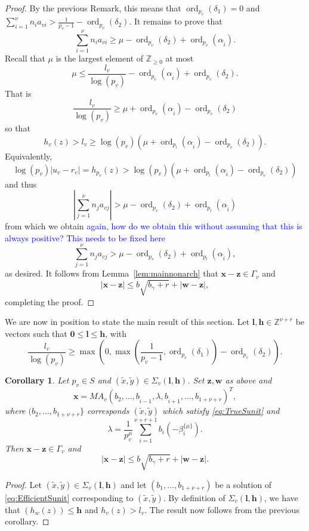 \documentclass[11pt]{report}
\newtheorem{corollary}[theorem]{Corollary}
\theoremstyle{definition}
\DeclareMathOperator{\ord}{ord}
\newcommand{\edit}[1]{\textcolor{blue}{#1}}
\begin{document}
\begin{proof}
By the previous Remark, this means that
$\ord_{p_v}(\delta_1) = 0$ and $\displaystyle \sum_{i = 1}^{\nu} n_{i}a_{vi} > \frac{1}{p_v-1} - \ord_{p_v}(\delta_2)$.
It remains to prove that
\[\sum_{i = 1}^{\nu} n_{i}a_{vi}  \geq \mu - \ord_{p_v}(\delta_2) + \ord_{p_v}(\alpha_{\hat{i}}).\]
Recall that $\mu$ is the largest element of $\mathbb{Z}_{\geq 0}$ at most
\[\mu \leq \frac{l_v}{\log(p_v)} - \ord_{p_v}(\alpha_{\hat{i}}) + \ord_{p_v}(\delta_2).\]
That is
\[\frac{l_v}{\log(p_v)} \geq \mu + \ord_{p_v}(\alpha_{\hat{i}}) - \ord_{p_v}(\delta_2)\]
so that
\[h_v(z) > l_v \geq \log(p_v)\left(\mu + \ord_{p_l}(\alpha_{\hat{i}}) - \ord_{p_v}(\delta_2)\right).\]
Equivalently,
\[\log(p_v)|u_v - r_v| = h_{p_v}(z) > \log(p_v)\left(\mu + \ord_{p_l}(\alpha_{\hat{i}}) - \ord_{p_v}(\delta_2)\right)\]
and thus
\[\left|\sum_{j = 1}^{\nu}n_ja_{vj}\right| > \mu - \ord_{p_v}(\delta_2) +
  \ord_{p_l}(\alpha_{\hat{i}})\]
from which we obtain \edit{again, how do we obtain this without assuming that this is always positive? This needs to be fixed here}
\[\sum_{j = 1}^{\nu}n_ja_{vj} > \mu - \ord_{p_v}(\delta_2) + \ord_{p_l}(\alpha_{\hat{i}}),\]
as desired. It follows from Lemma~\ref{lem:mainnonarch} that $\mathbf{x} - \mathbf{z} \in \Gamma_{v}$ and
\[|\mathbf{x} - \mathbf{z}| \leq b\sqrt{b_{\gamma} + r} + |\mathbf{w} - \mathbf{z}|,\]
completing the proof.
\end{proof}

We are now in position to state the main result of this section. Let $\mathbf{l},\mathbf{h} \in \mathbb{Z}^{\nu+r}$ be vectors such that $\mathbf{0} \leq \mathbf{l} \leq \mathbf{h}$, with
\[\frac{l_v}{\log(p_v)} \geq \max\left(0,\max\left( \frac{1}{p_v-1}, \ord_{p_v}(\delta_1)\right)
    - \ord_{p_v}(\delta_2)\right).\]
\begin{corollary}
  Let $p_v \in S$ and $(\tilde{x},\tilde{y}) \in \Sigma_v(\mathbf{l},\mathbf{h})$. Set $\mathbf{z},\mathbf{w}$ as above and
  \[\mathbf{x} = MA_v(b_2, \dots, b_{\hat{i} - 1}, \lambda, b_{\hat{i}+1}, \dots, b_{1+\nu+r})^T,\]
  where $(b_2,\dots, b_{1+\nu+r}\}$ corresponds $(\tilde{x},\tilde{y})$ which satisfy \eqref{eq:TrueSunit} and
  \[\lambda = \frac{1}{p_v^{\mu}}\sum_{i = 1}^{\nu + r + 1}b_i(-\beta_i^{\{\mu\}}).\]
  Then $\mathbf{x} - \mathbf{z} \in \Gamma_{v}$ and
  \[|\mathbf{x} - \mathbf{z}| \leq b\sqrt{b_{\gamma} + r} + |\mathbf{w} - \mathbf{z}|.\]
\end{corollary}

\begin{proof}
  Let $(\tilde{x},\tilde{y}) \in \Sigma_v(\mathbf{l},\mathbf{h})$ and let $(b_1, \dots, b_{1+\nu+r})$ be a solution of \eqref{eq:EfficientSunit} corresponding to $(\tilde{x},\tilde{y})$.
  By definition of $\Sigma_v(\mathbf{l},\mathbf{h})$, we have that $(h_w(z)) \leq \mathbf{h}$ and $h_v(z) > l_v$. The result now follows from the previous corollary.
\end{proof}
\end{document}
